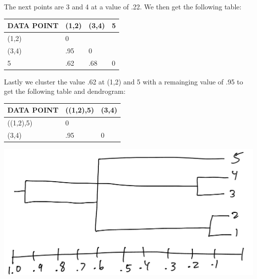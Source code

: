 \documentclass{article}
\begin{document}
\begin{enumerate}
    The next points are 3 and 4 at a value of .22. We then get the following table:

    \begin{table}[h]
        \begin{tabular}{|l|l|l|l|}
        \hline
        DATA POINT & (1,2) & (3,4) & 5 \\ \hline
        (1,2)      & 0     &       &   \\ \hline
        (3,4)      & .95   & 0     &   \\ \hline
        5          & .62   & .68   & 0 \\ \hline
        \end{tabular}
        \centering
    \end{table}

    \newpage

    Lastly we cluster the value .62 at (1,2) and 5 with a remainging value of .95 to get the following table and dendrogram:

    \begin{table}[h]
        \begin{tabular}{|l|l|l|}
        \hline
        DATA POINT & ((1,2),5) & (3,4) \\ \hline
        ((1,2),5)  & 0         &       \\ \hline
        (3,4)      & .95       & 0     \\ \hline
        \end{tabular}
        \centering
    \end{table}

    \begin{center}
        \includegraphics[scale=.21]{./images/Complete.jpeg}
    \end{center}

\end{enumerate}
\end{document}
